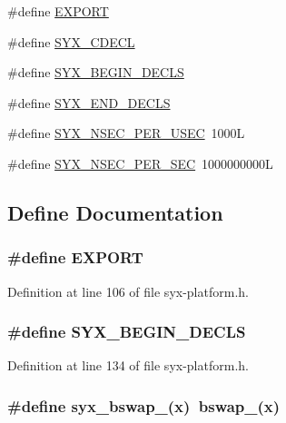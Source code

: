 \begin{CompactItemize}
\item 
\#define \hyperlink{syx-platform_8h_3472d8cdbb788d5f1815b3522595bc49}{EXPORT}
\item 
\#define \hyperlink{syx-platform_8h_6cade4ec30c903ca50c7b45775e2aeae}{SYX\_\-CDECL}
\item 
\#define \hyperlink{syx-platform_8h_6dde3825f7593345ee918459df0e3868}{SYX\_\-BEGIN\_\-DECLS}
\item 
\#define \hyperlink{syx-platform_8h_b49d39cb21f00cde506d2f96b695233d}{SYX\_\-END\_\-DECLS}
\item 
\#define \hyperlink{syx-platform_8h_71e4e9d590e9ab780f90220d90fdf5a0}{SYX\_\-NSEC\_\-PER\_\-USEC}~1000L
\item 
\#define \hyperlink{syx-platform_8h_e3268ffe29d61bd9abd8f17f7d4c7fa8}{SYX\_\-NSEC\_\-PER\_\-SEC}~1000000000L
\end{CompactItemize}


\subsection{Define Documentation}
\hypertarget{syx-platform_8h_3472d8cdbb788d5f1815b3522595bc49}{
\subsubsection{\setlength{\rightskip}{0pt plus 5cm}\#define EXPORT}}
\label{syx-platform_8h_3472d8cdbb788d5f1815b3522595bc49}




Definition at line 106 of file syx-platform.h.\hypertarget{syx-platform_8h_6dde3825f7593345ee918459df0e3868}{
\subsubsection{\setlength{\rightskip}{0pt plus 5cm}\#define SYX\_\-BEGIN\_\-DECLS}}
\label{syx-platform_8h_6dde3825f7593345ee918459df0e3868}




Definition at line 134 of file syx-platform.h.\hypertarget{syx-platform_8h_b32818fbe1b8ab4d2bca08f52cb6deae}{
\subsubsection{\setlength{\rightskip}{0pt plus 5cm}\#define syx\_\-bswap\_(x)~bswap\_(x)}}
\label{syx-platform_8h_b32818fbe1b8ab4d2bca08f52cb6deae}




